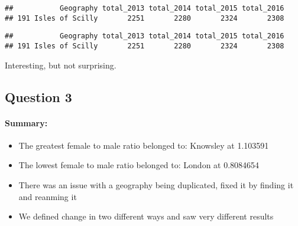 \documentclass[]{article}
\newenvironment{Shaded}{\begin{snugshade}}{\end{snugshade}}
\newcommand{\KeywordTok}[1]{\textcolor[rgb]{0.13,0.29,0.53}{\textbf{#1}}}
\newcommand{\DecValTok}[1]{\textcolor[rgb]{0.00,0.00,0.81}{#1}}
\newcommand{\OperatorTok}[1]{\textcolor[rgb]{0.81,0.36,0.00}{\textbf{#1}}}
\newcommand{\NormalTok}[1]{#1}
\providecommand{\tightlist}{%
  \setlength{\itemsep}{0pt}\setlength{\parskip}{0pt}}
\let\oldparagraph\paragraph
\renewcommand{\paragraph}[1]{\oldparagraph{#1}\mbox{}}
\begin{document}
\begin{Shaded}
\end{Shaded}

\begin{verbatim}
##           Geography total_2013 total_2014 total_2015 total_2016
## 191 Isles of Scilly       2251       2280       2324       2308
\end{verbatim}

\begin{Shaded}
\end{Shaded}

\begin{verbatim}
##           Geography total_2013 total_2014 total_2015 total_2016
## 191 Isles of Scilly       2251       2280       2324       2308
\end{verbatim}

Interesting, but not surprising.

\subsection{Question 3}\label{question-3}

\paragraph{Summary:}\label{summary-2}

\begin{itemize}
\tightlist
\item
  The greatest female to male ratio belonged to: Knowsley at 1.103591
\item
  The lowest female to male ratio belonged to: London at 0.8084654
\item
  There was an issue with a geography being duplicated, fixed it by
  finding it and reanming it
\item
  We defined change in two different ways and saw very different results
\end{itemize}
\end{document}

